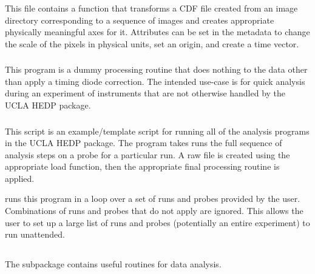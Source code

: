 
\subsubsection{}

This file contains a function that transforms a CDF file created from an image directory corresponding to a sequence of images and creates appropriate physically meaningful axes for it. Attributes can be set in the metadata to change the scale of the pixels in physical units, set an origin, and create a time vector. 

\subsubsection{}
This program is a dummy processing routine that does nothing to the data other than apply a timing diode correction. The intended use-case is for quick analysis during an experiment of instruments that are not otherwise handled by the UCLA HEDP package.

\subsubsection{}
This script is an example/template script for running all of the analysis programs in the UCLA HEDP package. The program  takes runs the full sequence of analysis steps on a probe for a particular run. A raw file is created using the appropriate load function, then the appropriate final processing routine is applied.

 runs this program in a loop over a set of runs and probes provided by the user. Combinations of runs and probes that do not apply are ignored. This allows the user to set up a large list of runs and probes (potentially an entire experiment) to run unattended.






\subsection{}

The  subpackage contains useful routines for data analysis. 


